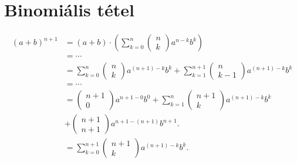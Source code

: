 \documentclass{article}
\begin{document}
\section{Binomiális tétel}
\begin{subequations}
\begin{align}
(a+b)^{n+1} &= (a+b) \cdot 
\left(
\sum_{k=0}^{n}
\begin{pmatrix}
n \\
k
\end{pmatrix}
a^{n-k}b^k
\right) \\
&= \cdots \nonumber\\
&= \sum_{k=0}^n
\begin{pmatrix}
n \\
k
\end{pmatrix}
a^{(n+1)-k}b^{k} + \sum_{k=1}^{n+1}
\begin{pmatrix}
n \\
k-1
\end{pmatrix}
a^{(n+1)-k}b^{k} \\
&= \cdots \nonumber\\
&= 
\begin{pmatrix}
n+1 \\
0
\end{pmatrix}
a^{n+1-0}b^0 + \sum_{k=1}^{n}
\begin{pmatrix}
n+1 \\
k
\end{pmatrix}
a^{(n+1)-k}b^{k} \\ \nonumber
&+
\begin{pmatrix}
n+1 \\
n+1
\end{pmatrix}
a^{n+1-(n+1)}b^{n+1}. \\
&= \sum_{k=0}^{n+1}
\begin{pmatrix}
n+1 \\
k
\end{pmatrix}
a^{(n+1)-k}b^k.
\end{align} 
\end{subequations}
\end{document}
